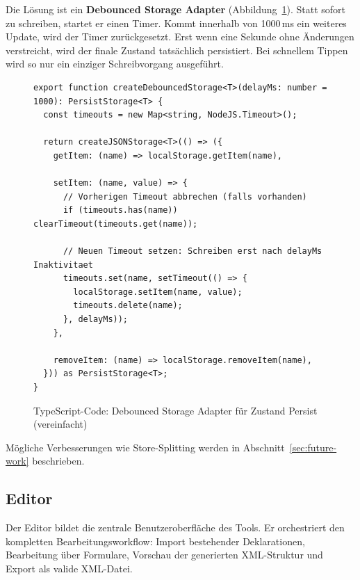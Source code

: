 \documentclass[a4paper,12pt]{article}
\begin{document}
\noindent Die Lösung ist ein \textbf{Debounced Storage Adapter} (Abbildung~\ref{fig:debounced-storage}). Statt sofort 
zu schreiben, startet er einen Timer. Kommt innerhalb von 1000\,ms ein weiteres Update, wird der Timer 
zurückgesetzt. Erst wenn eine Sekunde ohne Änderungen verstreicht, wird der finale Zustand tatsächlich 
persistiert. Bei schnellem Tippen wird so nur ein einziger Schreibvorgang ausgeführt.

\begin{figure}[H]
    \centering
    \begin{lstlisting}[language=typescriptselective,frame=single,backgroundcolor=\color{gray!10},basicstyle=\ttfamily\scriptsize,breaklines=true]
export function createDebouncedStorage<T>(delayMs: number = 1000): PersistStorage<T> {
  const timeouts = new Map<string, NodeJS.Timeout>();

  return createJSONStorage<T>(() => ({
    getItem: (name) => localStorage.getItem(name),

    setItem: (name, value) => {
      // Vorherigen Timeout abbrechen (falls vorhanden)
      if (timeouts.has(name)) clearTimeout(timeouts.get(name));

      // Neuen Timeout setzen: Schreiben erst nach delayMs Inaktivitaet
      timeouts.set(name, setTimeout(() => {
        localStorage.setItem(name, value);
        timeouts.delete(name);
      }, delayMs));
    },

    removeItem: (name) => localStorage.removeItem(name),
  })) as PersistStorage<T>;
}
    \end{lstlisting}
    \caption{TypeScript-Code: Debounced Storage Adapter für Zustand Persist (vereinfacht)}
    \label{fig:debounced-storage}
\end{figure}

\noindent Mögliche Verbesserungen wie Store-Splitting werden in Abschnitt~\ref{sec:future-work} beschrieben.

\newpage

\subsection{Editor}
\label{sec:editor-komponenten}

Der Editor bildet die zentrale Benutzeroberfläche des Tools. Er orchestriert den kompletten Bearbeitungsworkflow: 
Import bestehender Deklarationen, Bearbeitung über Formulare, Vorschau der generierten XML-Struktur und 
Export als valide XML-Datei.
\end{document}
